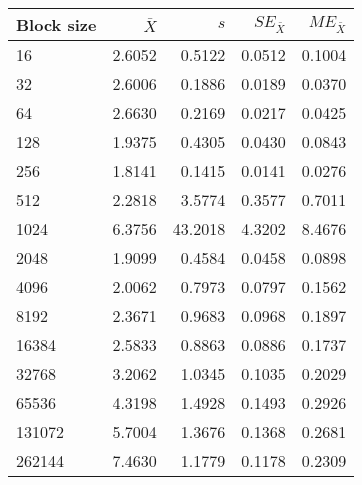 \begin{tabular}{lrrrr}\toprule
{\small Block size} & $\bar{X}$ & $s$ & $SE_{\bar{X}}$ & $ME_{\bar{X}}$ \\\midrule
16 & 2.6052 & 0.5122 & 0.0512 & 0.1004\\
32 & 2.6006 & 0.1886 & 0.0189 & 0.0370\\
64 & 2.6630 & 0.2169 & 0.0217 & 0.0425\\
128 & 1.9375 & 0.4305 & 0.0430 & 0.0843\\
256 & 1.8141 & 0.1415 & 0.0141 & 0.0276\\
512 & 2.2818 & 3.5774 & 0.3577 & 0.7011\\
1024 & 6.3756 & 43.2018 & 4.3202 & 8.4676\\
2048 & 1.9099 & 0.4584 & 0.0458 & 0.0898\\
4096 & 2.0062 & 0.7973 & 0.0797 & 0.1562\\
8192 & 2.3671 & 0.9683 & 0.0968 & 0.1897\\
16384 & 2.5833 & 0.8863 & 0.0886 & 0.1737\\
32768 & 3.2062 & 1.0345 & 0.1035 & 0.2029\\
65536 & 4.3198 & 1.4928 & 0.1493 & 0.2926\\
131072 & 5.7004 & 1.3676 & 0.1368 & 0.2681\\
262144 & 7.4630 & 1.1779 & 0.1178 & 0.2309\\
\bottomrule
\end{tabular}
